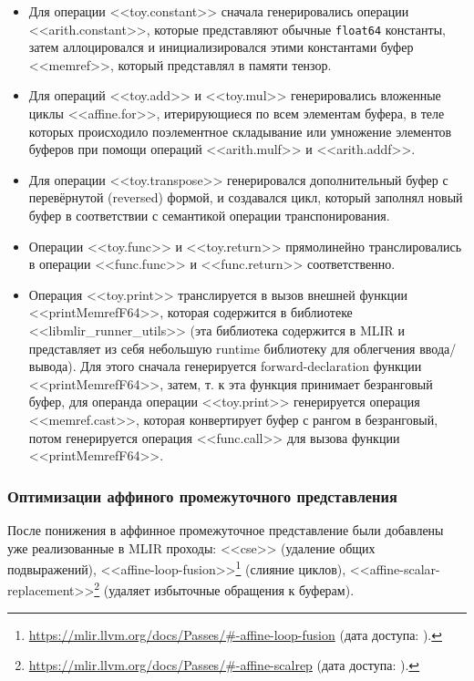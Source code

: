 \begin{itemize}
	\item Для операции <<toy.constant>> сначала генерировались операции <<arith.\-cons\-tant>>, которые представляют обычные \texttt{float64} константы, затем аллоцировался и инициализировался этими константами буфер <<memref>>, который представлял в памяти тензор.
	\item Для операций <<toy.add>> и <<toy.mul>> генерировались вложенные циклы <<af\-fine.\-for>>, итерирующиеся по всем элементам буфера, в теле которых происходило поэлементное складывание или умножение элементов буферов при помощи операций <<arith.\-mulf>> и <<arith.\-addf>>.
	\item Для операции <<toy.transpose>> генерировался дополнительный буфер с перевёрнутой (reversed) формой, и создавался цикл, который заполнял новый буфер в соответствии с семантикой операции транспонирования.
	\item Операции <<toy.func>> и <<toy.return>> прямолинейно транслировались в операции <<func.func>> и <<func.return>> соответственно.
	\item Операция <<toy.print>> транслируется в вызов внешней функции <<printMemrefF64>>, которая содержится в библиотеке <<libmlir\_\-run\-ner\_utils>> (эта библиотека содержится в MLIR и представляет из себя небольшую runtime библиотеку для облегчения ввода/вывода). Для этого сначала генерируется forward-declaration функции <<printMemrefF64>>, затем, т. к эта функция принимает безранговый буфер, для операнда операции <<toy.print>> генерируется операция <<memref.cast>>, которая конвертирует буфер с рангом в безранговый, потом генерируется операция <<func.call>> для вызова функции <<printMemrefF64>>.
\end{itemize}

\subsubsection{Оптимизации аффиного промежуточного представления}
После понижения в аффинное промежуточное представление были добавлены уже реализованные в MLIR проходы: <<cse>> (удаление общих подвыражений), <<affine-loop-fusion>>\footnote{\url{https://mlir.llvm.org/docs/Passes/\#-affine-loop-fusion} (дата доступа:   ).} (слияние циклов), <<affine-scalar-replacement>>\footnote{\url{https://mlir.llvm.org/docs/Passes/\#-affine-scalrep} (дата доступа:   ).} (удаляет избыточные обращения к буферам).

